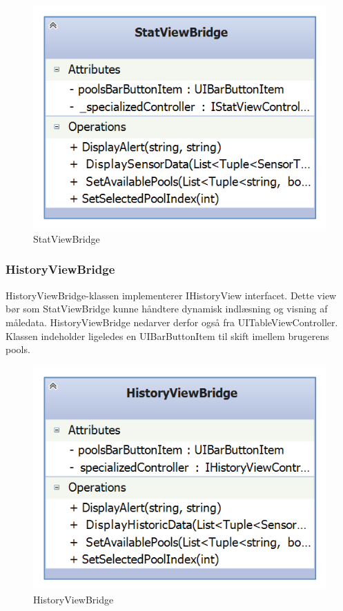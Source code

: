 \begin{figure}
	\centering
	\includegraphics[width=0.3\linewidth]{figs/design/ios_statviewbridge}
	\caption{StatViewBridge}
	\label{fig:ios_statviewbridge}
\end{figure}

\subsubsection{HistoryViewBridge}
HistoryViewBridge-klassen implementerer IHistoryView interfacet. Dette view bør som StatViewBridge kunne håndtere dynamisk indlæsning og visning af måledata. HistoryViewBridge nedarver derfor også fra UITableViewController. Klassen indeholder ligeledes en UIBarButtonItem til skift imellem brugerens pools.

\begin{figure}
	\centering
	\includegraphics[width=0.3\linewidth]{figs/design/ios_historyviewbridge}
	\caption{HistoryViewBridge}
	\label{fig:ios_historyviewbridge}
\end{figure}